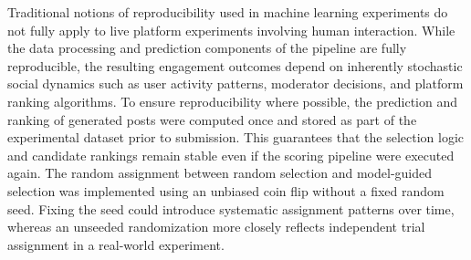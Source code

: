 Traditional notions of reproducibility used in machine learning experiments do not fully apply to live platform experiments involving human interaction. 
While the data processing and prediction components of the pipeline are fully reproducible, the resulting engagement outcomes depend on inherently stochastic social dynamics such as user activity patterns, moderator decisions, and platform ranking algorithms.
To ensure reproducibility where possible, the prediction and ranking of generated posts were computed once and stored as part of the experimental dataset prior to submission. 
This guarantees that the selection logic and candidate rankings remain stable even if the scoring pipeline were executed again.
The random assignment between random selection and model-guided selection was implemented using an unbiased coin flip without a fixed random seed. 
Fixing the seed could introduce systematic assignment patterns over time, whereas an unseeded randomization more closely reflects independent trial assignment in a real-world experiment.